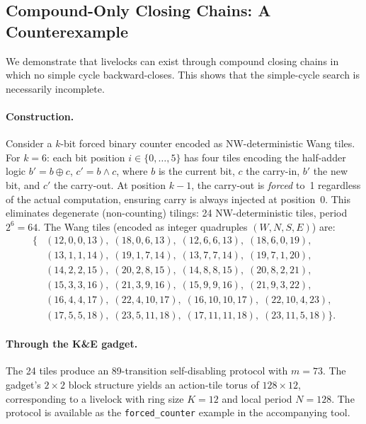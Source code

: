 \documentclass[11pt]{article}
\begin{document}
\subsection{Compound-Only Closing Chains: A Counterexample}
\label{sec:counterexample}

We demonstrate that livelocks can exist through compound closing chains in which no simple cycle backward-closes. This shows that the simple-cycle search is necessarily incomplete.

\paragraph{Construction.} Consider a $k$-bit forced binary counter encoded as NW-deterministic Wang tiles. For $k = 6$: each bit position $i \in \{0, \ldots, 5\}$ has four tiles encoding the half-adder logic $b' = b \oplus c$, $c' = b \wedge c$, where $b$ is the current bit, $c$ the carry-in, $b'$ the new bit, and $c'$ the carry-out. At position $k-1$, the carry-out is \emph{forced} to~1 regardless of the actual computation, ensuring carry is always injected at position~0. This eliminates degenerate (non-counting) tilings: 24 NW-deterministic tiles, period $2^6 = 64$. The Wang tiles (encoded as integer quadruples $(W, N, S, E)$) are:
{\small
\begin{align*}
\{&(12,0,0,13),\;(18,0,6,13),\;(12,6,6,13),\;(18,6,0,19),\\
  &(13,1,1,14),\;(19,1,7,14),\;(13,7,7,14),\;(19,7,1,20),\\
  &(14,2,2,15),\;(20,2,8,15),\;(14,8,8,15),\;(20,8,2,21),\\
  &(15,3,3,16),\;(21,3,9,16),\;(15,9,9,16),\;(21,9,3,22),\\
  &(16,4,4,17),\;(22,4,10,17),\;(16,10,10,17),\;(22,10,4,23),\\
  &(17,5,5,18),\;(23,5,11,18),\;(17,11,11,18),\;(23,11,5,18)\}.
\end{align*}
}

\paragraph{Through the K\&E gadget.} The 24 tiles produce an 89-transition self-disabling protocol with $m = 73$. The gadget's $2 \times 2$ block structure yields an action-tile torus of $128 \times 12$, corresponding to a livelock with ring size $K = 12$ and local period $N = 128$. The protocol is available as the \texttt{forced\_counter} example in the accompanying tool.
\end{document}
